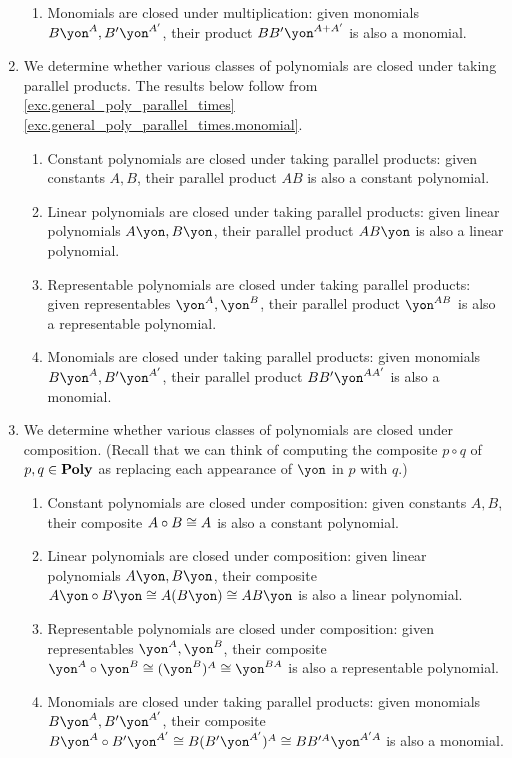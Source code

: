 \documentclass[Book-Poly]{subfiles}
\begin{document}
\begin{exercise}
\begin{solution}
\begin{enumerate}
\begin{enumerate}
        \item Monomials are closed under multiplication: given monomials $B\yon^A, B'\yon^{A'}$, their product $BB'\yon^{A+A'}$ is also a monomial.
    \end{enumerate}
    \item We determine whether various classes of polynomials are closed under taking parallel products.
    The results below follow from \cref{exc.general_poly_parallel_times} \cref{exc.general_poly_parallel_times.monomial}.
    \begin{enumerate}
        \item Constant polynomials are closed under taking parallel products: given constants $A, B$, their parallel product $AB$ is also a constant polynomial.
        \item Linear polynomials are closed under taking parallel products: given linear polynomials $A\yon, B\yon$, their parallel product $AB\yon$ is also a linear polynomial.
        \item Representable polynomials are closed under taking parallel products: given representables $\yon^A, \yon^B$, their parallel product $\yon^{AB}$ is also a representable polynomial.
        \item Monomials are closed under taking parallel products: given monomials $B\yon^A, B'\yon^{A'}$, their parallel product $BB'\yon^{AA'}$ is also a monomial.
    \end{enumerate}
    \item We determine whether various classes of polynomials are closed under composition. (Recall that we can think of computing the composite $p \circ q$ of $p, q \in \mathbf{Poly}$ as replacing each appearance of $\yon$ in $p$ with $q$.)
    \begin{enumerate}
        \item Constant polynomials are closed under composition: given constants $A, B$, their composite $A \circ B \cong A$ is also a constant polynomial.
        \item Linear polynomials are closed under composition: given linear polynomials $A\yon, B\yon$, their composite $A\yon \circ B\yon \iso A(B\yon) \iso AB\yon$ is also a linear polynomial.
        \item Representable polynomials are closed under composition: given representables $\yon^A, \yon^B$, their composite $\yon^A \circ \yon^B \iso (\yon^B)^A \iso \yon^{BA}$ is also a representable polynomial.
        \item Monomials are closed under taking parallel products: given monomials $B\yon^A, B'\yon^{A'}$, their composite $B\yon^A \circ B'\yon^{A'} \iso B(B'\yon^{A'})^A \iso BB'^A\yon^{A'A}$ is also a monomial.
    \end{enumerate}
\end{enumerate}
\end{solution}
\end{exercise}
\end{document}
